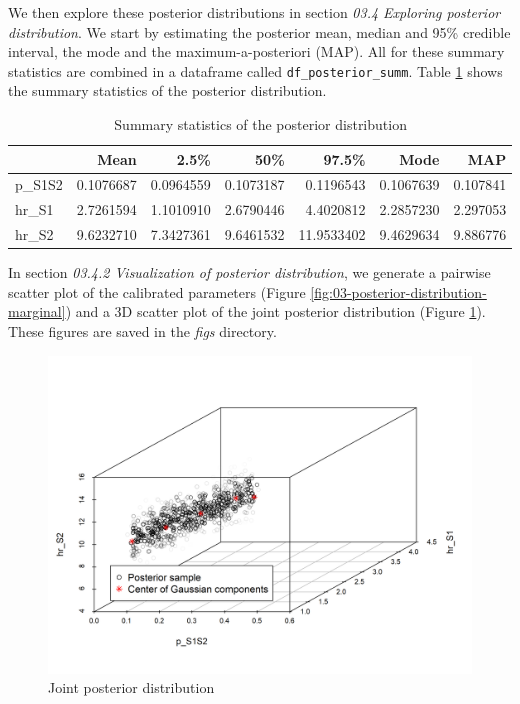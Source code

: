 \documentclass[]{book}
\begin{document}
We then explore these posterior distributions in section \emph{03.4
Exploring posterior distribution}. We start by estimating the posterior
mean, median and 95\% credible interval, the mode and the
maximum-a-posteriori (MAP). All for these summary statistics are
combined in a dataframe called \texttt{df\_posterior\_summ}. Table
\ref{tab:SummaryCal} shows the summary statistics of the posterior
distribution.

\begin{table}[t]

\caption{\label{tab:SummaryCal}Summary statistics of the posterior distribution}
\centering
\begin{tabular}{l|r|r|r|r|r|r}
\hline
  & Mean & 2.5\% & 50\% & 97.5\% & Mode & MAP\\
\hline
p\_S1S2 & 0.1076687 & 0.0964559 & 0.1073187 & 0.1196543 & 0.1067639 & 0.107841\\
\hline
hr\_S1 & 2.7261594 & 1.1010910 & 2.6790446 & 4.4020812 & 2.2857230 & 2.297053\\
\hline
hr\_S2 & 9.6232710 & 7.3427361 & 9.6461532 & 11.9533402 & 9.4629634 & 9.886776\\
\hline
\end{tabular}
\end{table}

In section \emph{03.4.2 Visualization of posterior distribution}, we
generate a pairwise scatter plot of the calibrated parameters (Figure
\ref{fig:03-posterior-distribution-marginal}) and a 3D scatter plot of
the joint posterior distribution (Figure
\ref{fig:Posterior-distribution-joint}). These figures are saved in the
\emph{figs} directory.

\begin{figure}

{\centering \includegraphics[width=33.33in]{../figs/03_posterior_distribution_joint} 

}

\caption{Joint posterior distribution}\label{fig:Posterior-distribution-joint}
\end{figure}
\end{document}
